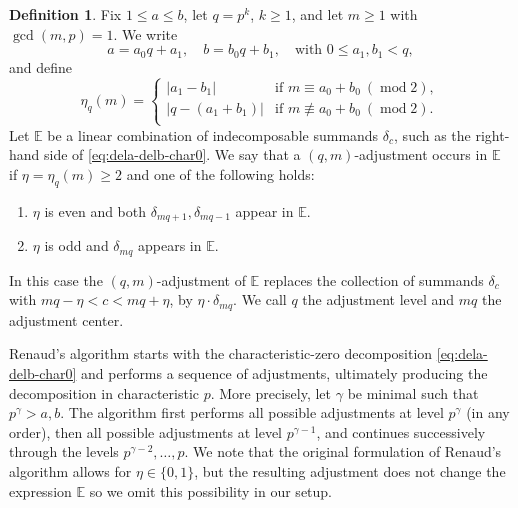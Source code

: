 \documentclass[11pt,reqno]{amsart}
\newcommand{\defi}[1]{{\upshape\sffamily #1}}
\newcommand{\bb}[1]{\mathbb{#1}}
\newcommand{\op}[1]{\operatorname{#1}}
\theoremstyle{definition}
\newtheorem{definition}[theorem]{Definition}
\theoremstyle{remark}
\numberwithin{equation}{section}
\begin{document}
\begin{definition}\label{def:adjustments}
    Fix $1\leq a\leq b$, let $q=p^k$, $k\geq 1$, and let $m\geq 1$ with $\gcd(m,p)=1$. We write
    \[ a = a_0q+a_1,\quad b=b_0q+b_1,\quad\text{with } 0\leq a_1,b_1<q,\]
    and define 
    \[\eta_q(m) = \begin{cases}
        |a_1-b_1| & \text{if }m\equiv a_0+b_0\ (\op{mod }2),\\
        |q-(a_1+b_1)| & \text{if }m\not\equiv a_0+b_0\ (\op{mod }2).\\
    \end{cases}\]
    Let $\bb{E}$ be a linear combination of indecomposable summands $\delta_c$, such as the
    right-hand side of \eqref{eq:dela-delb-char0}. We say that a
    \defi{$(q,m)$-adjustment occurs in $\bb{E}$} if $\eta=\eta_q(m)\geq 2$ and one of the following holds:
    \begin{enumerate}
        \item $\eta$ is even and both $\delta_{mq+1},\delta_{mq-1}$ appear in $\bb{E}$.
        \item $\eta$ is odd and $\delta_{mq}$ appears in $\bb{E}$.
    \end{enumerate}
    In this case the \defi{$(q,m)$-adjustment} of $\bb{E}$ replaces the collection of summands $\delta_c$ with $mq-\eta<c<mq+\eta$, by $\eta\cdot\delta_{mq}$. We call $q$ the \defi{adjustment level} and $mq$ the \defi{adjustment center}.
\end{definition}

Renaud's algorithm starts with the characteristic-zero decomposition
\eqref{eq:dela-delb-char0} and performs a sequence of adjustments, ultimately producing the decomposition in characteristic $p$. More precisely, let $\gamma$ be minimal such that $p^\gamma>a,b$. The algorithm first performs all possible adjustments at level $p^\gamma$
(in any order), then all possible adjustments at level $p^{\gamma-1}$, and continues successively through the levels $p^{\gamma-2},\ldots,p$. We note that the original formulation of Renaud's algorithm allows for $\eta\in\{0,1\}$, but the resulting adjustment does not change the expression $\bb{E}$ so we omit this possibility in our setup.  
\end{document}
